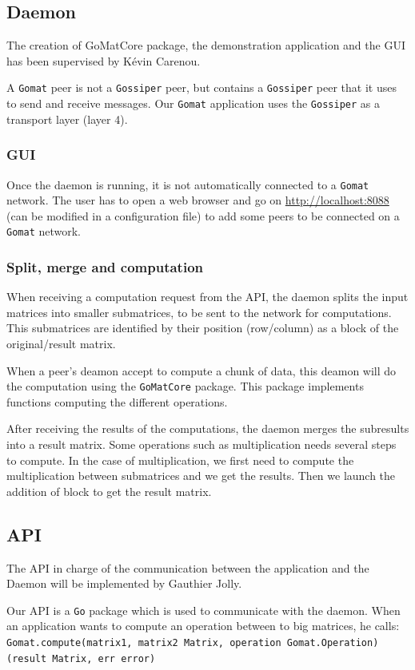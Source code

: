 \documentclass[a4paper,12pt]{article}
\newcommand{\Gossiper}{\texttt{Gossiper}\xspace}
\newcommand{\Gomat}{\texttt{Gomat}\xspace}
\newcommand{\Go}{\texttt{Go}\xspace}
\begin{document}
        \subsection{Daemon}
        The creation of GoMatCore package, the demonstration application and the GUI has been supervised by Kévin Carenou.

        A \Gomat peer is not a \Gossiper peer, but contains a \Gossiper peer that it uses to send and receive messages. Our \Gomat application uses the \Gossiper as a transport layer (layer 4).

        \subsubsection{GUI}
        Once the daemon is running, it is not automatically connected to a \Gomat network. The user has to open a web browser and go on \url{http://localhost:8088} (can be modified in a configuration file) to add some peers to be connected on a
    \Gomat network.

    \subsubsection{Split, merge and computation}
    When receiving a computation request from the API, the daemon splits the input matrices into smaller submatrices, to be sent to the network for computations. This submatrices are identified by their position (row/column) as a block of the original/result matrix.

    When a peer's deamon accept to compute a chunk of data, this deamon will do the computation using the \texttt{GoMatCore} package. This package implements functions computing the different operations.

    After receiving the results of the computations, the daemon merges the subresults into a result matrix. Some operations such as multiplication needs several steps to compute. In the case of multiplication, we first need to compute the multiplication between submatrices and we get the results. Then we launch the addition of block to get the result matrix.

    \subsection{API}
    The API in charge of the communication between the application and the Daemon will be implemented by Gauthier Jolly.

    Our API is a \Go package which is used to communicate with the daemon. When an application wants to compute an operation between to big matrices, he calls:\\
    \texttt{Gomat.compute(matrix1, matrix2 Matrix, operation Gomat.Operation) (result Matrix, err error)}
\end{document}
